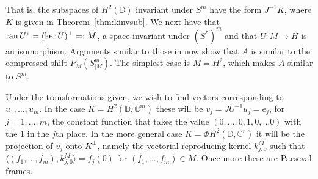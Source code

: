 \documentclass[11pt]{amsart}
\theoremstyle{definition}
\theoremstyle{remark}
\numberwithin{equation}{section}
\def\CC{{\mathbb C}}
\def\DD{{\mathbb D}}
\def\rang{\mathop{\rm ran}\nolimits}
\begin{document}
That is, the subspaces  of $H^2(\DD)$ invariant under $S^m$ have the form $J^{-1}K$, where $K$ is
given in Theorem~\ref{thm:kinvsub}.
We next have that $\rang U^* = (\ker U)^\perp =: M$, a space invariant under $(S^*)^m$ and that $U:M \to H$
is an isomorphism.
Arguments similar to those in \cite{CHP20} now show that $A$  is similar to the compressed shift
$P_M(S^m_{|M})$. The simplest case is $M=H^2$, which makes $A$ similar to $S^m$.

Under the transformations given, we wish to find vectors corresponding to $u_1,\ldots,u_m$.
In the case $K=H^2(\DD,\CC^m)$
these will be $v_j= JU^{-1}u_j= e_{j}$, for $j=1,\ldots,m$, the constant function
that takes the value $(0,\ldots,0,1,0, \ldots 0)$ with the $1$ in the $j$th place.
In the more general case $K=\Phi H^2(\DD,\CC^r)$
it will be the projection of $v_j$ onto $K^\perp$, namely the vectorial reproducing kernel $k^M_{j,0}$
such that $\langle (f_1,\ldots,f_m),k^M_{j,0} \rangle = f_j(0)$ for
$(f_1,\ldots,f_m) \in M$. Once more these are Parseval frames.
\end{document}

